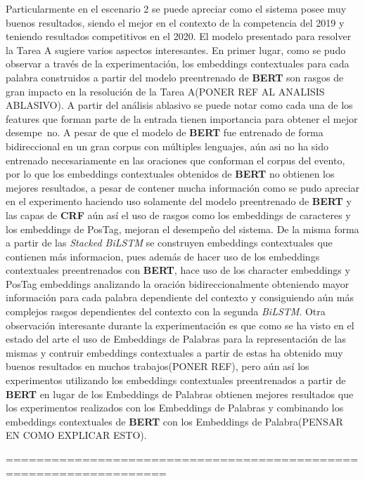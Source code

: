 Particularmente en el escenario 2 se puede apreciar como el sistema posee muy buenos resultados, siendo el mejor en el contexto de la competencia del 2019 y teniendo resultados competitivos en el 2020. El modelo presentado para resolver la Tarea A sugiere varios aspectos interesantes. En primer lugar, como se pudo observar a trav\'es de la experimentaci\'on, los embeddings contextuales para cada palabra construidos a partir del modelo preentrenado de \textbf{BERT} son rasgos de gran impacto en la resoluci\'on de la Tarea A(PONER REF AL ANALISIS ABLASIVO). A partir del an\'alisis ablasivo se puede notar como cada una de los features que forman parte de la entrada tienen importancia para obtener el mejor desempe~no. A pesar de que el modelo de \textbf{BERT} fue entrenado de forma bidireccional en un gran corpus con m\'ultiples lenguajes, a\'un asi no ha sido entrenado necesariamente en las oraciones que conforman el corpus del evento, por lo que los embeddings contextuales obtenidos de \textbf{BERT} no obtienen los mejores resultados, a pesar de contener mucha informaci\'on como se pudo apreciar en el experimento haciendo uso solamente del modelo preentrenado de \textbf{BERT} y las capas de \textbf{CRF} a\'un as\'i el uso de rasgos como los embeddings de caracteres y los embeddings de PosTag, mejoran el desempe\~no del sistema. De la misma forma a partir de las \emph{Stacked BiLSTM} se construyen embeddings contextuales que contienen m\'as informacion, pues adem\'as de hacer uso de los embeddings contextuales preentrenados con \textbf{BERT}, hace uso de los character embeddings y PosTag embeddings analizando la oraci\'on bidireccionalmente obteniendo mayor informaci\'on para cada palabra dependiente del contexto y consiguiendo a\'un m\'as complejos rasgos dependientes del contexto con la segunda \emph{BiLSTM}. Otra observaci\'on interesante durante la experimentaci\'on es que como se ha visto en el estado del arte el uso de Embeddings de Palabras para la representaci\'on de las mismas y contruir embeddings contextuales a partir de estas ha obtenido muy buenos resultados en muchos trabajos(PONER REF), pero a\'un as\'i los experimentos utilizando los embeddings contextuales preentrenados a partir de \textbf{BERT} en lugar de los Embeddings de Palabras obtienen mejores resultados que los experimentos realizados con los Embeddings de Palabras y combinando los embeddings contextuales de \textbf{BERT} con los Embeddings de Palabra(PENSAR EN COMO EXPLICAR ESTO).








===================================================================
